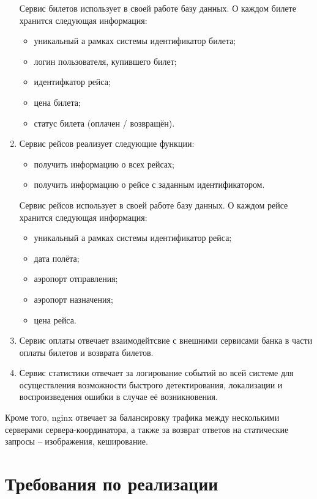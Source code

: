 \begin{enumerate}
     Сервис билетов использует в своей работе базу данных. О каждом билете хранится следующая информация:
    \begin{itemize}
        \item уникальный а рамках системы идентификатор билета;
        \item логин пользователя, купившего билет;
        \item идентифкатор рейса;
        \item цена билета;
        \item статус билета (оплачен / возвращён).
    \end{itemize}
    
    \item Сервис рейсов реализует следующие функции:
    \begin{itemize}
        \item получить информацию о всех рейсах; 
        \item получить информацию о рейсе с заданным идентификатором.
    \end{itemize}

    Сервис рейсов использует в своей работе базу данных. О каждом рейсе хранится следующая информация:
    \begin{itemize}
        \item уникальный а рамках системы идентификатор рейса;
        \item дата полёта;
        \item аэропорт отправления;
        \item аэропорт назначения;
        \item цена рейса.
    \end{itemize}

    \item Сервис оплаты отвечает взаимодейтсвие с внешними сервисами банка в части оплаты билетов и возврата билетов.
    
    \item Сервис статистики отвечает за логирование событий во всей системе для осуществления возможности быстрого детектирования, локализации и воспроизведения ошибки в случае её возникновения. 
\end{enumerate}

Кроме того, nginx отвечает за балансировку трафика между несколькими серверами сервера-координатора, а также за возврат ответов на статические запросы -- изображения, кеширование.

\section{Требования по реализации}

